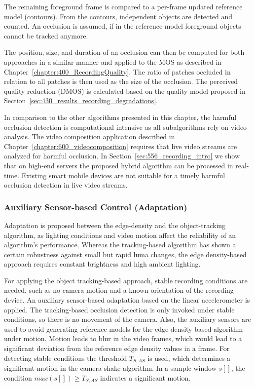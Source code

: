 The remaining foreground frame is compared to a per-frame updated reference model (contours). From the contours, independent objects are detected and counted. An occlusion is assumed, if in the reference model foreground objects cannot be tracked anymore.

The position, size, and duration of an occlusion can then be computed for both approaches in a similar manner and applied to the \ac{MOS} as described in Chapter~\ref{chapter:400_RecordingQuality}. 
The ratio of patches occluded in relation to all patches is then used as the size of the occlusion.
The perceived quality reduction (\ac{DMOS}) is calculated based on the quality model proposed in Section~\ref{sec:430_results_recording_degradations}. 

In comparison to the other algorithms presented in this chapter, the harmful occlusion detection is computational intensive as all subalgorithms rely on video analysis.
The video composition application described in Chapter~\ref{chapter:600_videocomposition} requires that live video streams are analyzed for harmful occlusion.
In Section~\ref{sec:556_recording_intro} we show that on high-end servers the proposed hybrid algorithm can be processed in real-time.
Existing smart mobile devices are not suitable for a timely harmful occlusion detection in live video streams. 
\subsubsection{Auxiliary Sensor-based Control (Adaptation)}
Adaptation is proposed between the edge-density and the object-tracking algorithm, as lighting conditions and video motion affect the reliability of an algorithm's performance. Whereas the tracking-based algorithm has shown a certain robustness against small but rapid luma changes, the edge density-based approach requires constant brightness and high ambient lighting.

For applying the object tracking-based approach, stable recording conditions are needed, such as no camera motion and a known orientation of the recording device. 
An auxiliary sensor-based adaptation based on the linear accelerometer is applied. 
The tracking-based occlusion detection is only invoked under stable conditions, so there is no movement of the camera. 
Also, the auxiliary sensors are used to avoid generating reference models for the edge density-based algorithm under motion. 
Motion leads to blur in the video frames, which would lead to a significant deviation from the reference edge density values in a frame.
For detecting stable conditions the threshold $T_{S,AS}$ is used, which determines a significant motion in the camera shake algorithm.
In a sample window $s[]$, the condition $max(s[]) \geq T_{S,AS}$ indicates a significant motion.
